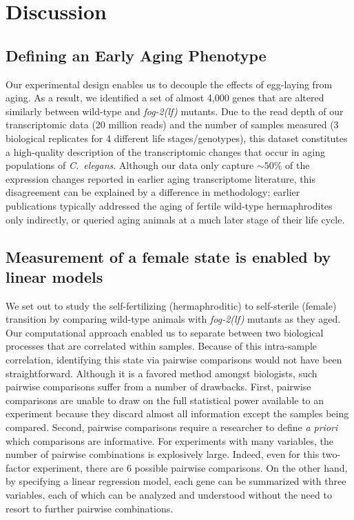 \documentclass[10pt,letterpaper,twocolumn]{article}
\newcommand{\cel}{\emph{C.~elegans}}
\newcommand{\fog}{\emph{\mbox{fog-2(lf)}}}
\begin{document}
\section*{Discussion}
\label{sec:discussion}

\subsection*{Defining an Early Aging Phenotype}
\label{sub:Defining an Early Aging Phenotype}

Our experimental design enables us to decouple the effects of egg-laying from
aging. As a result, we identified a set of almost 4,000 genes that are altered
similarly between wild-type and \fog{} mutants. Due to the read depth of our
transcriptomic data (20 million reads) and the number of samples measured (3
biological replicates for 4 different life stages/genotypes), this dataset
constitutes a high-quality description of the transcriptomic changes that occur
in aging populations of \cel{}.
Although our data only capture $\sim50\%$ of the expression changes reported
in earlier aging transcriptome literature, this disagreement can be explained
by a difference in methodology; earlier publications typically addressed the
aging of fertile wild-type hermaphrodites only indirectly, or queried aging
animals at a much later stage of their life cycle.


\subsection*{Measurement of a female state is enabled by linear models}
\label{sub:female_state}

We set out to study the self-fertilizing (hermaphroditic) to self-sterile
(female) transition by comparing wild-type animals with \fog{} mutants as they
aged. Our computational approach enabled us to separate between two biological
processes that are correlated within samples. Because of this intra-sample
correlation, identifying this state via pairwise comparisons would not have been
straightforward. Although it is a favored method amongst biologists, such
pairwise comparisons suffer from a number of drawbacks.
First, pairwise comparisons are unable to draw on the full statistical power
available to an experiment because they discard almost all information except
the samples being compared. Second, pairwise comparisons require a researcher
to define \emph{a priori} which comparisons are informative. For experiments
with many variables, the number of pairwise combinations is explosively large.
Indeed, even for this two-factor experiment, there are 6 possible pairwise
comparisons. On the other hand, by specifying a linear regression model, each
gene can be summarized with three variables, each of which can be analyzed and
understood without the need to resort to further pairwise combinations.
\end{document}
